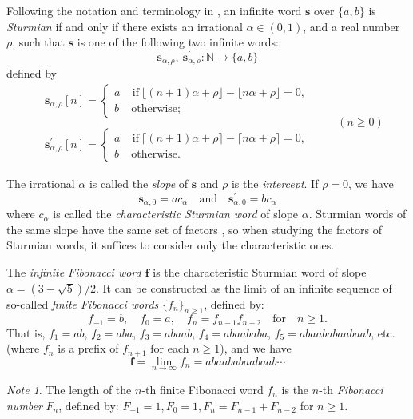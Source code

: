 \documentclass[11pt]{amsart}
\newcommand{\1}{\bar{1}}
\newcommand{\NN}{\mathbb{N}}
\newcommand{\bs}{\boldsymbol{s}}
\newcommand{\bbf}{\boldsymbol{f}}
\theoremstyle{plain}
\theoremstyle{definition}
\theoremstyle{remark}
\newtheorem*{note}{Note}
\begin{document}
Following the notation and terminology in \cite[Ch.~2]{mL02alge}, an infinite word $\bs$ over $\{a,b\}$ is \textit{Sturmian} if and only if there exists an irrational
$\alpha \in (0,1)$, and a real number $\rho$, such that $\bs$ is one
of the following two infinite words:
\[
  \bs_{\alpha,\rho}, ~\bs_{\alpha,\rho}^{\prime}: \NN \longrightarrow \{a,b\}
\]
defined by
\[
 \begin{matrix}
  &\bs_{\alpha,\rho}[n] = \begin{cases}
                        a    ~~~~~\mbox{if} ~\lfloor(n+1)\alpha + \rho\rfloor -
                        \lfloor n\alpha + \rho\rfloor = 0, \\
                        b    ~~~~~\mbox{otherwise};
                       \end{cases} \\
  &\qquad \\
  &\bs_{\alpha,\rho}^\prime[n] = \begin{cases}
                        a    ~~~~~\mbox{if} ~\lceil(n+1)\alpha + \rho\rceil -
                        \lceil n\alpha + \rho\rceil = 0, \\
                        b    ~~~~~\mbox{otherwise}.
                       \end{cases}
 \end{matrix} \qquad (n \geq 0)
\]

The irrational $\alpha$ is called the \emph{slope} of $\bs$ and
$\rho$ is the \emph{intercept}. If $\rho = 0$, we have
\[
\bs_{\alpha,0} = ac_{\alpha} \quad \mbox{and} \quad \bs_{\alpha,0}^\prime =
  bc_{\alpha}
\]
where $c_{\alpha}$ is called the \emph{characteristic Sturmian word} of slope $\alpha$. Sturmian words of the same slope have the same set of factors \cite[Prop.~2.1.18]{mL02alge}, so when studying the factors of Sturmian words, it suffices to consider only the characteristic ones.

The \textit{infinite Fibonacci word $\bbf$} is the characteristic Sturmian word of slope $\alpha = (3 - \sqrt5)/2$. It can be constructed as the limit of an infinite sequence of so-called \textit{finite Fibonacci words} $\{f_n\}_{n\ge 1}$, defined by:
\[
f_{-1} = b, \quad f_0 = a, \quad f_n = f_{n-1}f_{n-2} \quad \mbox{for} \quad  n \geq 1.
\]
That is, $f_1 = ab$, $f_2 = aba$, $f_3 =abaab$, $f_4=abaababa$, $f_5=abaababaabaab$, etc. (where $f_n$ is a prefix of $f_{n+1}$ for each $n\geq 1$), and we have
\[
\bbf = \lim_{n\to\infty} f_n = abaababaabaab\cdots
\]
\begin{note} The length of the $n$-th finite Fibonacci word $f_n$ is the $n$-th \textit{Fibonacci number} $F_n$, defined by: $F_{-1}=1, F_0 =1, F_n = F_{n-1} + F_{n-2}$ for $n \geq 1$.
\end{note}
\end{document}

